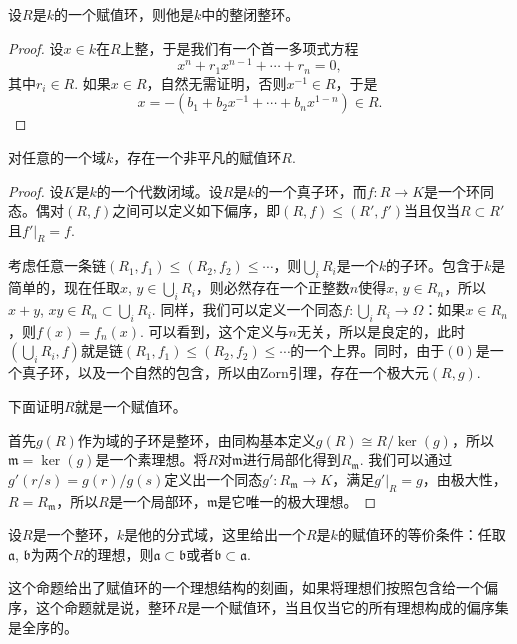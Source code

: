 \begin{pro}
设$R$是$k$的一个赋值环，则他是$k$中的整闭整环。
\end{pro}

\begin{proof}
	设$x\in k$在$R$上整，于是我们有一个首一多项式方程
	\[
		x^n+r_1x^{n-1}+\cdots+r_n=0,
	\]
	其中$r_i\in R$. 如果$x\in R$，自然无需证明，否则$x^{-1}\in R$，于是
	\[
		x=-(b_1+b_2x^{-1}+\cdots+b_n x^{1-n})\in R.
	\]
\end{proof}

\begin{pro}
对任意的一个域$k$，存在一个非平凡的赋值环$R$.
\end{pro}

\begin{proof}
	设$K$是$k$的一个代数闭域。设$R$是$k$的一个真子环，而$f:R\to K$是一个环同态。偶对$(R,f)$之间可以定义如下偏序，即$(R,f)\leq (R',f')$当且仅当$R\subset R'$且$f'|_R=f$.

	考虑任意一条链$(R_1,f_1)\leq (R_2,f_2)\leq \cdots$，则$\bigcup_i R_i$是一个$k$的子环。包含于$k$是简单的，现在任取$x$, $y\in \bigcup_i R_i$，则必然存在一个正整数$n$使得$x$, $y\in R_n$，所以$x+y$, $xy\in R_n\subset \bigcup_i R_i$. 同样，我们可以定义一个同态$f:\bigcup_i R_i\to \Omega$：如果$x\in R_n$，则$f(x)=f_n(x)$. 可以看到，这个定义与$n$无关，所以是良定的，此时$(\bigcup_i R_i,f)$就是链$(R_1,f_1)\leq (R_2,f_2)\leq \cdots$的一个上界。同时，由于$(0)$是一个真子环，以及一个自然的包含，所以由Zorn引理，存在一个极大元$(R,g)$.

	下面证明$R$就是一个赋值环。

	首先$g(R)$作为域的子环是整环，由同构基本定义$g(R)\cong R/\ker(g)$，所以$\mathfrak{m}=\ker (g)$是一个素理想。将$R$对$\mathfrak{m}$进行局部化得到$R_\mathfrak{m}$. 我们可以通过$g'(r/s)=g(r)/g(s)$定义出一个同态$g':R_\mathfrak{m}\to K$，满足$g'|_R=g$，由极大性，$R=R_\mathfrak{m}$，所以$R$是一个局部环，$\mathfrak{m}$是它唯一的极大理想。\notprove
\end{proof}

\begin{pro}
设$R$是一个整环，$k$是他的分式域，这里给出一个$R$是$k$的赋值环的等价条件：任取$\mathfrak{a}$, $\mathfrak{b}$为两个$R$的理想，则$\mathfrak{a}\subset \mathfrak{b}$或者$\mathfrak{b}\subset \mathfrak{a}$. 
\end{pro}

这个命题给出了赋值环的一个理想结构的刻画，如果将理想们按照包含给一个偏序，这个命题就是说，整环$R$是一个赋值环，当且仅当它的所有理想构成的偏序集是全序的。

